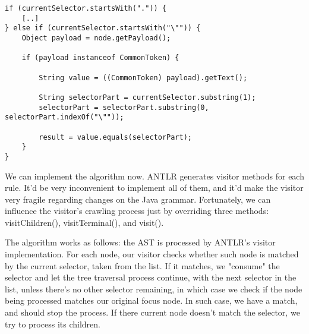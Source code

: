 \documentclass[11pt]{article}
\begin{document}
\begin{verbatim}
if (currentSelector.startsWith(".")) {
    [..]
} else if (currentSelector.startsWith("\"")) {
    Object payload = node.getPayload();

    if (payload instanceof CommonToken) {

        String value = ((CommonToken) payload).getText();

        String selectorPart = currentSelector.substring(1);
        selectorPart = selectorPart.substring(0, selectorPart.indexOf("\""));

        result = value.equals(selectorPart);
    }
}
\end{verbatim}

We can implement the algorithm now. ANTLR generates visitor methods for each rule. It'd be very inconvenient to
implement all of them, and it'd make the visitor very fragile regarding changes on the Java grammar.
Fortunately, we can influence the visitor's crawling process just by overriding three methods: visitChildren(), visitTerminal(), and visit().

The algorithm works as follows: the AST is processed by ANTLR's visitor implementation. For each node, our visitor
checks whether such node is matched by the current selector, taken from the list. If it matches, we "consume" the selector and let
the tree traversal process continue, with the next selector in the list, unless there's no other selector remaining, in which case we check
if the node being processed matches our original focus node. In such case, we have a match, and should stop the process.
If there current node doesn't match the selector, we try to process its children.
\end{document}
